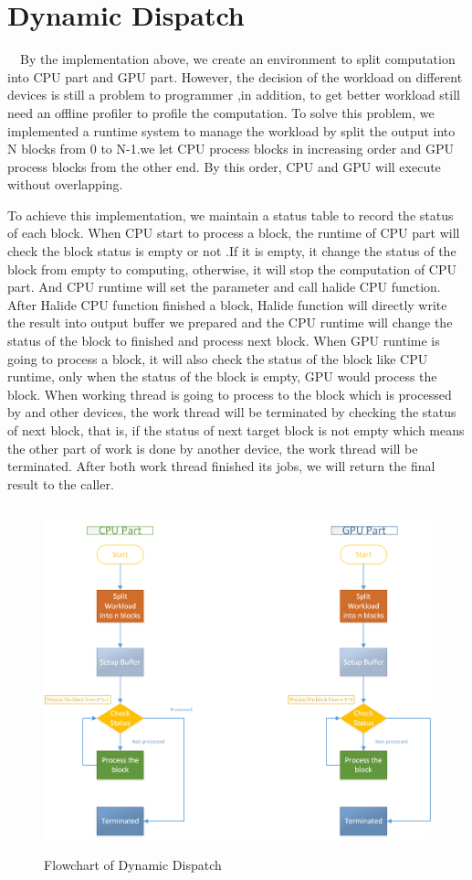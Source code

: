 \section{Dynamic Dispatch}

\quad \ \ By the implementation above, we create an environment to split computation into CPU part and GPU part. However, the decision of the workload on different devices is still  a problem to programmer ,in addition, to get better workload still need an offline profiler to profile the computation. To solve this problem, we implemented a runtime system to manage the workload by split the output into N blocks from 0 to N-1.we let CPU process blocks in increasing order and GPU process blocks from the other end. By this order, CPU and GPU will execute without overlapping.

	To achieve this implementation, we maintain a status table to record the status of each block. When CPU start to process a block, the runtime of CPU part will check the block status is empty or not .If it is empty, it change the status of the block from empty to computing, otherwise, it will stop the computation of CPU part. And CPU runtime will set the parameter and call halide CPU function. After Halide CPU function finished a block, Halide function will directly write the result into output buffer we prepared and the CPU runtime will change the status of the block to finished and process next block. When GPU runtime is going to process a block, it will also check the status of the block like CPU runtime, only when the status of the block is empty, GPU would process the block. When working thread is going to process to the block which is processed by and other devices, the work thread will be terminated by checking the status of next block, that is, if the status of next target block is not empty which means the other part of work is done by another device, the work thread will be terminated. After both work thread finished its jobs, we will return the final result to the caller.
\begin{figure}[hbtp]
\centering
\includegraphics[height=10cm]{img/DynamicDispatchFlow.png}
\caption{Flowchart of Dynamic Dispatch}
\label{fig:my_label}
\end{figure}

